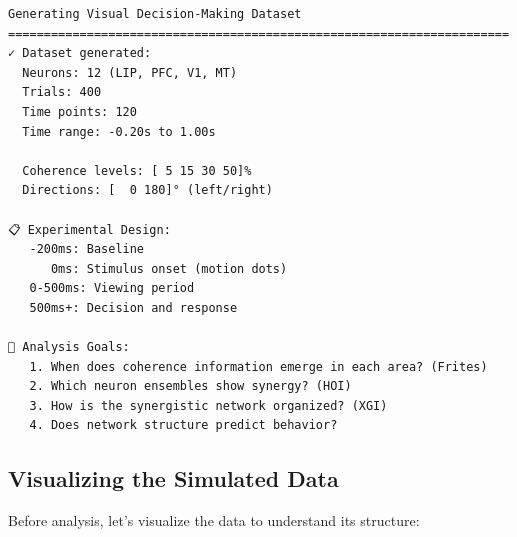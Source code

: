 \documentclass[
  11pt,
  letterpaper,
  oneside,
  openany]{book}
\begin{document}
\begin{verbatim}
Generating Visual Decision-Making Dataset
======================================================================
✓ Dataset generated:
  Neurons: 12 (LIP, PFC, V1, MT)
  Trials: 400
  Time points: 120
  Time range: -0.20s to 1.00s

  Coherence levels: [ 5 15 30 50]%
  Directions: [  0 180]° (left/right)

📋 Experimental Design:
   -200ms: Baseline
      0ms: Stimulus onset (motion dots)
   0-500ms: Viewing period
   500ms+: Decision and response

🎯 Analysis Goals:
   1. When does coherence information emerge in each area? (Frites)
   2. Which neuron ensembles show synergy? (HOI)
   3. How is the synergistic network organized? (XGI)
   4. Does network structure predict behavior?
\end{verbatim}

\subsection{Visualizing the Simulated
Data}\label{visualizing-the-simulated-data}

Before analysis, let's visualize the data to understand its structure:
\end{document}
